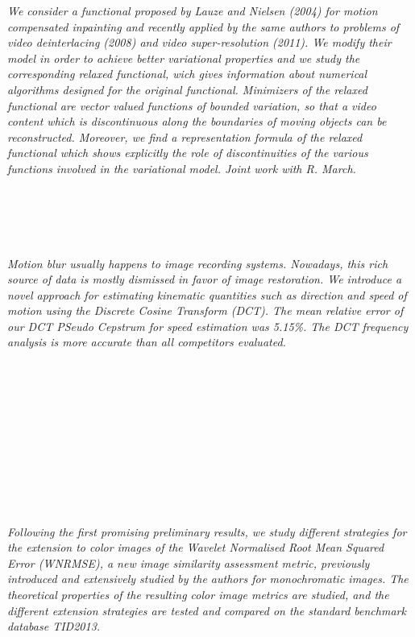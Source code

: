   \begin{multicols}{2}
    \textit{We consider a functional proposed by Lauze and Nielsen (2004) for motion compensated inpainting and recently applied by the same authors to problems of video deinterlacing (2008) and video super-resolution (2011). 
We modify their model in order to achieve better variational properties and we study the corresponding relaxed functional, wich gives information about numerical algorithms designed for the original functional.
Minimizers of the relaxed functional are vector valued functions of bounded variation, so that a video content which is discontinuous along the boundaries of moving objects can be reconstructed. Moreover, we find a representation formula of the relaxed functional which shows explicitly the role of discontinuities of the various functions involved in the variational model.
Joint work with R. March.}\\
\\ 
      \\
      \\\\
\\
    \textit{Motion blur usually happens to image recording systems. Nowadays, this rich source of data is mostly dismissed in favor of image restoration. We introduce a novel approach for estimating kinematic quantities such as direction and speed of motion using the Discrete Cosine Transform (DCT). The mean relative error of our DCT PSeudo Cepstrum for speed estimation was 5.15\%. The DCT frequency analysis is more accurate than all competitors evaluated.}\\
\\ 
      \\
      \\\\
      \\
      \\\\
      \\
      \\\\
\\
    \textit{Following the first promising preliminary results, we study different strategies for the extension to color images of the Wavelet Normalised Root Mean Squared Error (WNRMSE), a new image similarity assessment metric, previously introduced and extensively studied by the authors for monochromatic images. The theoretical properties of the resulting color image metrics are studied, and the different extension strategies are tested and compared on the standard benchmark database TID2013. }\\

\end{multicols}
